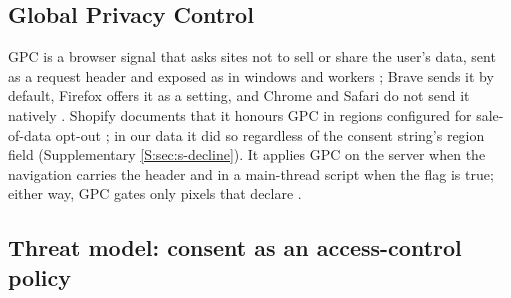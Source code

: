 \subsection{Global Privacy Control}\label{sec:bg-gpc}

GPC is a browser signal that asks sites not to sell or share the user's data, sent as a  request header and exposed as  in windows and workers \citep{w3c_gpc}; Brave sends it by default, Firefox offers it as a setting, and Chrome and Safari do not send it natively \citep{gpc_site}. Shopify documents that it honours GPC in regions configured for sale-of-data opt-out \citep{shopify_customerprivacy}; in our data it did so regardless of the consent string's region field (Supplementary \ref*{S:sec:s-decline}). It applies GPC on the server when the navigation carries the header and in a main-thread script when the flag is true; either way, GPC gates only pixels that declare .

\subsection{Threat model: consent as an access-control policy}\label{sec:bg-threat}

